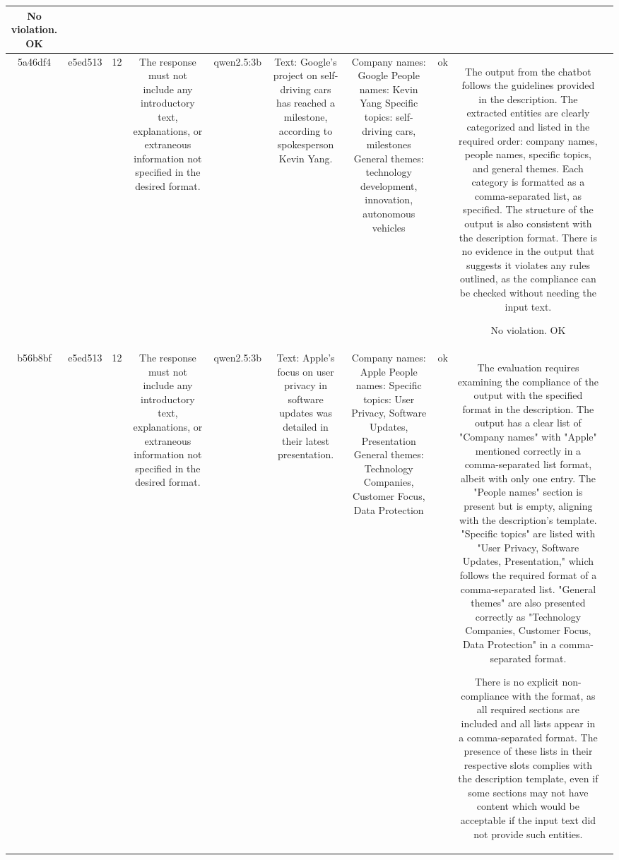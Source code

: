 \begin{table}[h!]
\begin{tabular}{|c|c|c|c|c|c|c|c|c|c|}
No violation.
OK & \\
\hline
5a46df4 & e5ed513 & 12 & The response must not include any introductory text, explanations, or extraneous information not specified in the desired format. & qwen2.5:3b & Text: Google's project on self-driving cars has reached a milestone, according to spokesperson Kevin Yang. & Company names: Google
People names: Kevin Yang
Specific topics: self-driving cars, milestones
General themes: technology development, innovation, autonomous vehicles & ok & The output from the chatbot follows the guidelines provided in the description. The extracted entities are clearly categorized and listed in the required order: company names, people names, specific topics, and general themes. Each category is formatted as a comma-separated list, as specified. The structure of the output is also consistent with the description format. There is no evidence in the output that suggests it violates any rules outlined, as the compliance can be checked without needing the input text.

No violation.
OK & \\
\hline
b56b8bf & e5ed513 & 12 & The response must not include any introductory text, explanations, or extraneous information not specified in the desired format. & qwen2.5:3b & Text: Apple's focus on user privacy in software updates was detailed in their latest presentation. & Company names: Apple
People names: 
Specific topics: User Privacy, Software Updates, Presentation
General themes: Technology Companies, Customer Focus, Data Protection & ok & The evaluation requires examining the compliance of the output with the specified format in the description. The output has a clear list of "Company names" with "Apple" mentioned correctly in a comma-separated list format, albeit with only one entry. The "People names" section is present but is empty, aligning with the description's template. "Specific topics" are listed with "User Privacy, Software Updates, Presentation," which follows the required format of a comma-separated list. "General themes" are also presented correctly as "Technology Companies, Customer Focus, Data Protection" in a comma-separated format. 

There is no explicit non-compliance with the format, as all required sections are included and all lists appear in a comma-separated format. The presence of these lists in their respective slots complies with the description template, even if some sections may not have content which would be acceptable if the input text did not provide such entities.


\end{tabular}
\end{table}
